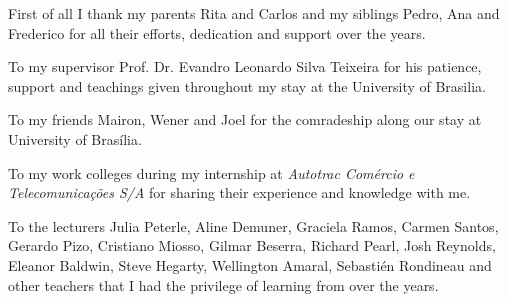 \begin{agradecimentos}
First of all I thank my parents Rita and Carlos and my siblings Pedro, Ana and Frederico for all their efforts, dedication and support over the years.
\par
To my supervisor Prof. Dr. Evandro Leonardo Silva Teixeira for his patience, support and teachings given throughout my stay at the University of Brasilia.
\par
To my friends Mairon, Wener and Joel for the comradeship along our stay at University of Brasília.
\par
To my work colleges during my internship at \textit{Autotrac Comércio e Telecomunicações S/A} for sharing their experience and knowledge with me.
\par
To the lecturers Julia Peterle, Aline Demuner, Graciela Ramos, Carmen Santos, Gerardo Pizo, Cristiano Miosso, Gilmar Beserra, Richard Pearl, Josh Reynolds, Eleanor Baldwin, Steve Hegarty, Wellington Amaral, Sebastién Rondineau and other teachers that I had the privilege of learning from over the years.
\end{agradecimentos}
